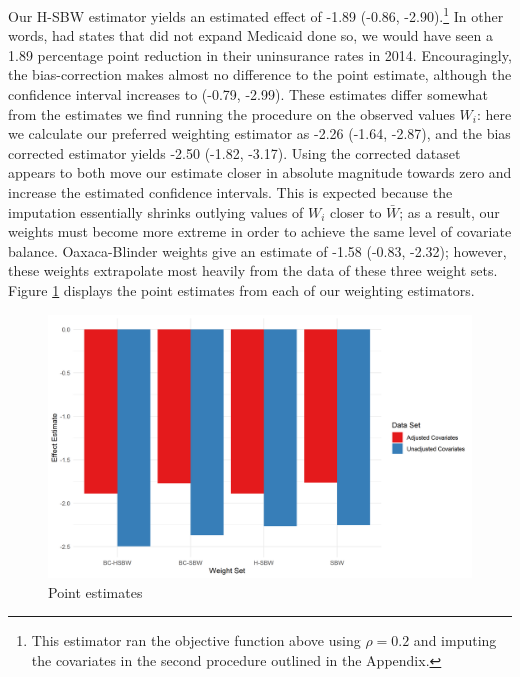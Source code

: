 \documentclass[12pt]{article}
\begin{document}
Our H-SBW estimator yields an estimated effect of -1.89 (-0.86, -2.90).\footnote{This estimator ran the objective function above using $\rho = 0.2$ and imputing the covariates in the second procedure outlined in the Appendix.} In other words, had states that did not expand Medicaid done so, we would have seen a 1.89 percentage point reduction in their uninsurance rates in 2014. Encouragingly, the bias-correction makes almost no difference to the point estimate, although the confidence interval increases to (-0.79, -2.99). These estimates differ somewhat from the estimates we find running the procedure on the observed values $W_i$: here we calculate our preferred weighting estimator as -2.26 (-1.64, -2.87), and the bias corrected estimator yields -2.50 (-1.82, -3.17). Using the corrected dataset appears to both move our estimate closer in absolute magnitude towards zero and increase the estimated confidence intervals. This is expected because the imputation essentially shrinks outlying values of $W_i$ closer to $\bar{W}$; as a result, our weights must become more extreme in order to achieve the same level of covariate balance. Oaxaca-Blinder weights give an estimate of -1.58 (-0.83, -2.32); however, these weights extrapolate most heavily from the data of these three weight sets. Figure \ref{estimators} displays the point estimates from each of our weighting estimators. 

\begin{figure}[B]
\begin{center}
    \includegraphics[scale=0.6]{01_Plots/point-estimates-c1.png}
    \caption{Point estimates}
    \label{estimators}
\end{center}
\end{figure}
\end{document}
